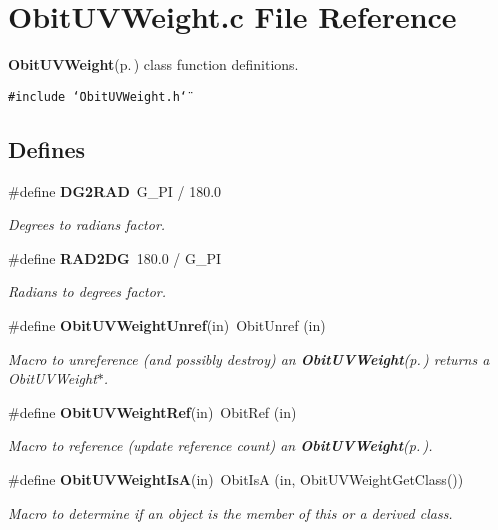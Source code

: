 \section{Obit\-UVWeight.c File Reference}
\label{ObitUVWeight_8c}
{\bf Obit\-UVWeight}{\rm (p.\,\pageref{structObitUVWeight})} class function definitions. 

{\tt \#include \char`\"{}Obit\-UVWeight.h\char`\"{}}\par
\subsection*{Defines}
\begin{CompactItemize}
\item 
\#define {\bf DG2RAD}\ G\_\-PI / 180.0
\begin{CompactList}\small\item\em Degrees to radians factor. \item\end{CompactList}\item 
\#define {\bf RAD2DG}\ 180.0 / G\_\-PI
\begin{CompactList}\small\item\em Radians to degrees factor. \item\end{CompactList}\item 
\#define {\bf Obit\-UVWeight\-Unref}(in)\ Obit\-Unref (in)
\begin{CompactList}\small\item\em Macro to unreference (and possibly destroy) an {\bf Obit\-UVWeight}{\rm (p.\,\pageref{structObitUVWeight})} returns a Obit\-UVWeight$\ast$. \item\end{CompactList}\item 
\#define {\bf Obit\-UVWeight\-Ref}(in)\ Obit\-Ref (in)
\begin{CompactList}\small\item\em Macro to reference (update reference count) an {\bf Obit\-UVWeight}{\rm (p.\,\pageref{structObitUVWeight})}. \item\end{CompactList}\item 
\#define {\bf Obit\-UVWeight\-Is\-A}(in)\ Obit\-Is\-A (in, Obit\-UVWeight\-Get\-Class())
\begin{CompactList}\small\item\em Macro to determine if an object is the member of this or a derived class. \item\end{CompactList}\end{CompactItemize}
